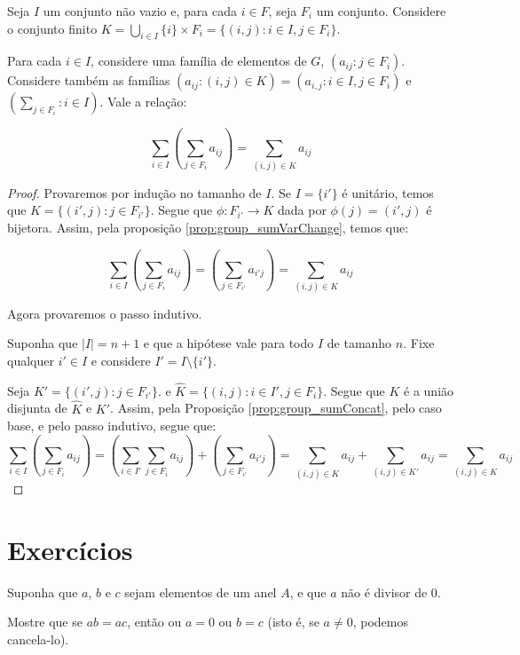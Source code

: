 \begin{prop}\label{prop:group_sumConcatII}
    Seja $I$ um conjunto não vazio e, para cada $i \in F$, seja $F_i$ um conjunto.
    Considere o conjunto finito $K=\bigcup_{i \in I}\{i\}\times F_i=\{(i, j): i \in I, j \in F_i\}$.

    Para cada $i \in I$, considere uma família de elementos de $G$, $(a_{ij}: j \in F_i)$.
    Considere também as famílias $(a_{ij}: (i, j)\in K)=(a_{i, j}: i\in I, j \in F_i)$ e $(\sum_{j \in F_i}: i\in I)$. Vale a relação:

    \[\sum_{i \in I}\left(\sum_{j \in F_i}a_{ij}\right)=\sum_{(i, j)\in K}a_{ij}\]
\end{prop}
\begin{proof}
    Provaremos por indução no tamanho de $I$.
    Se $I=\{i'\}$ é unitário, temos que $K=\{(i', j): j \in F_{i'}\}$.
    Segue que $\phi:F_{i'}\rightarrow K$ dada por $\phi(j)=(i', j)$ é bijetora.
    Assim, pela proposição \ref{prop:group_sumVarChange}, temos que:

    \[\sum_{i \in I}\left(\sum_{j \in F_i}a_{ij}\right)=\left(\sum_{j \in F_{i'}}a_{i'j}\right)=\sum_{(i, j)\in K}a_{ij}\]

    Agora provaremos o passo indutivo.

    Suponha que $|I|=n+1$ e que a hipótese vale para todo $I$ de tamanho $n$. Fixe qualquer $i' \in I$ e considere $I'=I\setminus \{i'\}$.

    Seja $K'=\{(i', j): j \in F_{i'}\}$. e $\hat K=\{(i, j): i \in I', j \in F_i\}$.
    Segue que $K$ é a união disjunta de $\hat K$ e $K'$.
    Assim, pela Proposição \ref{prop:group_sumConcat}, pelo caso base, e pelo passo indutivo, segue que:
    \[\sum_{i \in I}\left(\sum_{j \in F_i}a_{ij}\right)=\left(\sum_{i \in I'}\sum_{j \in F_{i}}a_{ij}\right)+\left(\sum_{j \in F_{i'}}a_{i'j}\right)=\sum_{(i, j)\in \hat K}a_{ij}+\sum_{(i, j)\in K'}a_{ij}=\sum_{(i, j)\in K}a_{ij}\]


\end{proof}

\section{Exercícios}
\begin{exer}
    Suponha que $a$, $b$ e $c$ sejam elementos de um anel $A$, e que $a$ não é divisor de $0$.
    
    Mostre que se $ab = ac$, então ou $a = 0$ ou $b = c$ (isto é, se $a\neq 0$, podemos cancela-lo).
\end{exer}